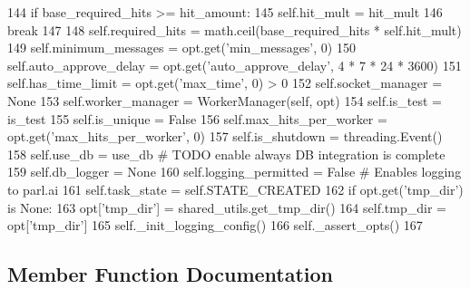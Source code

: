 \begin{DoxyCode}
144             \textcolor{keywordflow}{if} base\_required\_hits >= hit\_amount:
145                 self.hit\_mult = hit\_mult
146                 \textcolor{keywordflow}{break}
147 
148         self.required\_hits = math.ceil(base\_required\_hits * self.hit\_mult)
149         self.minimum\_messages = opt.get(\textcolor{stringliteral}{'min\_messages'}, 0)
150         self.auto\_approve\_delay = opt.get(\textcolor{stringliteral}{'auto\_approve\_delay'}, 4 * 7 * 24 * 3600)
151         self.has\_time\_limit = opt.get(\textcolor{stringliteral}{'max\_time'}, 0) > 0
152         self.socket\_manager = \textcolor{keywordtype}{None}
153         self.worker\_manager = WorkerManager(self, opt)
154         self.is\_test = is\_test
155         self.is\_unique = \textcolor{keyword}{False}
156         self.max\_hits\_per\_worker = opt.get(\textcolor{stringliteral}{'max\_hits\_per\_worker'}, 0)
157         self.is\_shutdown = threading.Event()
158         self.use\_db = use\_db  \textcolor{comment}{# TODO enable always DB integration is complete}
159         self.db\_logger = \textcolor{keywordtype}{None}
160         self.logging\_permitted = \textcolor{keyword}{False}  \textcolor{comment}{# Enables logging to parl.ai}
161         self.task\_state = self.STATE\_CREATED
162         \textcolor{keywordflow}{if} opt.get(\textcolor{stringliteral}{'tmp\_dir'}) \textcolor{keywordflow}{is} \textcolor{keywordtype}{None}:
163             opt[\textcolor{stringliteral}{'tmp\_dir'}] = shared\_utils.get\_tmp\_dir()
164         self.tmp\_dir = opt[\textcolor{stringliteral}{'tmp\_dir'}]
165         self.\_init\_logging\_config()
166         self.\_assert\_opts()
167 
\end{DoxyCode}


\subsection{Member Function Documentation}
\mbox{\label{classparlai_1_1mturk_1_1core_1_1dev_1_1mturk__manager_1_1MTurkManager_ab77c6bdccf256625b918d0215b7bfcdf}} 
